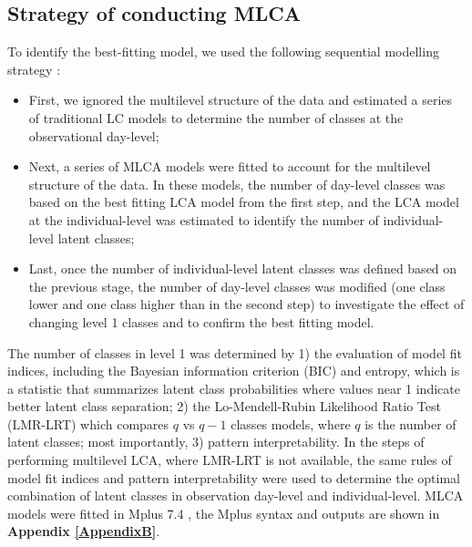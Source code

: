 \subsection{Strategy of conducting MLCA}\vspace{-0.3cm}

To identify the best-fitting model, we used the following sequential modelling strategy \parencite{henry2010multilevel}: 

\begin{itemize}
	\item First, we ignored the multilevel structure of the data and estimated a series of traditional LC models to determine the number of classes at the observational day-level;
	\item Next, a series of MLCA models were fitted to account for the multilevel structure of the data. In these models, the number of day-level classes was based on the best fitting LCA model from the first step, and the LCA model at the individual-level was estimated to identify the number of individual-level latent classes;
	\item Last, once the number of individual-level latent classes was defined based on the previous stage, the number of day-level classes was modified (one class lower and one class higher than in the second step) to investigate the effect of changing level 1 classes and to confirm the best fitting model.
\end{itemize}

The number of classes in level 1 was determined by 1) the evaluation of model fit indices, including the Bayesian information criterion (BIC) and entropy, which is a statistic that summarizes latent class probabilities where values near 1 indicate better latent class separation; 2) the Lo-Mendell-Rubin Likelihood Ratio Test (LMR-LRT) \parencite{lo2001testing, nylund2007deciding} which compares $q$ vs $q-1$ classes models, where $q$ is the number of latent classes; most importantly, 3) pattern interpretability. In the steps of performing multilevel LCA, where LMR-LRT is not available, the same rules of model fit indices and pattern interpretability were used to determine the optimal combination of latent classes in observation day-level and individual-level. MLCA models were fitted in Mplus 7.4 \parencite{muthen2005mplus}, the Mplus syntax and outputs are shown in \textbf{Appendix \ref{AppendixB}}. \vspace{-0.3cm}



